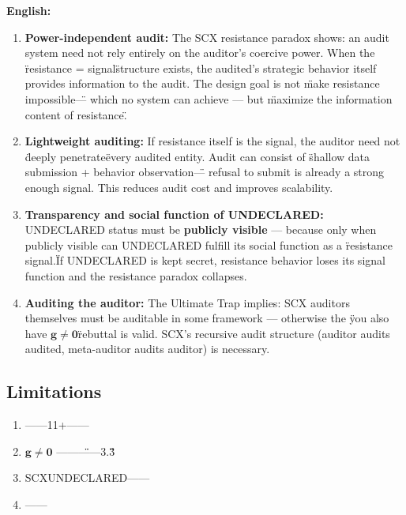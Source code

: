\documentclass[12pt,a4paper]{article}
\theoremstyle{remark}
\newcommand{\g}{\mathbf{g}}
\begin{document}
\vspace{4pt}
\noindent
\textbf{English:}

\begin{enumerate}[label=(\arabic*)]
    \item \textbf{Power-independent audit:} The SCX resistance paradox shows: an audit system need not rely entirely on the auditor's coercive power. When the \"resistance = signal\" structure exists, the audited's strategic behavior itself provides information to the audit. The design goal is not \"make resistance impossible\" — which no system can achieve — but \"maximize the information content of resistance.\"
    
    \item \textbf{Lightweight auditing:} If resistance itself is the signal, the auditor need not \"deeply penetrate\" every audited entity. Audit can consist of \"shallow data submission + behavior observation\" — refusal to submit is already a strong enough signal. This reduces audit cost and improves scalability.
    
    \item \textbf{Transparency and social function of UNDECLARED:} UNDECLARED status must be \textbf{publicly visible} — because only when publicly visible can UNDECLARED fulfill its social function as a \"resistance signal.\" If UNDECLARED is kept secret, resistance behavior loses its signal function and the resistance paradox collapses.
    
    \item \textbf{Auditing the auditor:} The Ultimate Trap implies: SCX auditors themselves must be auditable in some framework — otherwise the \"you also have $ \g \neq \mathbf{0} $\" rebuttal is valid. SCX's recursive audit structure (auditor audits audited, meta-auditor audits auditor) is necessary.
\end{enumerate}

\subsection{}
\subsection{Limitations}

\noindent
\textbf{} 

\begin{enumerate}[label=(\arabic*)]
    \item \textbf{} ——11+——
    
    \item \textbf{}  $ \g \neq \mathbf{0} $ ——\"\"——3.3\"\"\"\"
    
    \item \textbf{} SCXUNDECLARED——
    
    \item \textbf{} ——
\end{enumerate}
\end{document}
